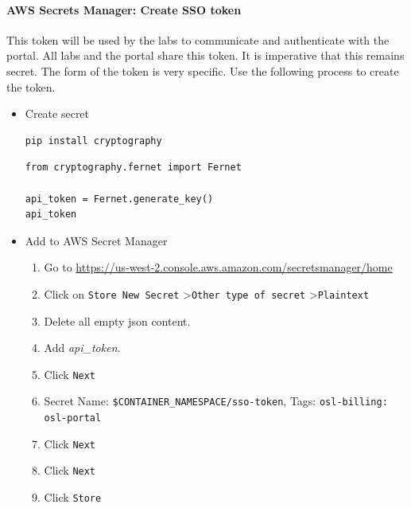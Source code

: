 \paragraph{AWS Secrets Manager: Create SSO token}

This token will be used by the labs to communicate and authenticate with the portal. All labs and the portal share this token. It is imperative that this remains secret. The form of the token is very specific. Use the following process to create the token.

\begin{itemize}
\item Create secret

\begin{verbatim}
pip install cryptography
\end{verbatim}

\begin{verbatim}
from cryptography.fernet import Fernet

api_token = Fernet.generate_key()
api_token
\end{verbatim}


\item Add to AWS Secret Manager

\begin{enumerate}
\item Go to \href{https://us-west-2.console.aws.amazon.com/secretsmanager/home}{https://us-west-2.console.aws.amazon.com/secretsmanager/home}


\item Click on \texttt{Store New Secret} \textgreater  \texttt{Other type of secret} \textgreater  \texttt{Plaintext}


\item Delete all empty json content.


\item Add \textit{api\_token}.


\item Click \texttt{Next}


\item Secret Name: \texttt{\$CONTAINER\_NAMESPACE/sso-token}, Tags: \texttt{osl-billing: osl-portal}


\item Click \texttt{Next}


\item Click \texttt{Next}


\item Click \texttt{Store}
\end{enumerate}
\end{itemize}

